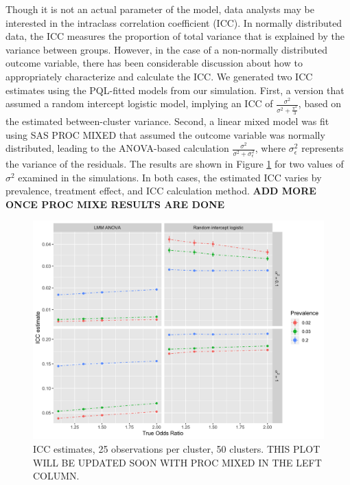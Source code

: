 \documentclass[Afour,times,sagev,doublespace]{sagej}
\begin{document}
Though it is not an actual parameter of the model, data analysts may be interested in the intraclass correlation coefficient (ICC). In normally distributed data, the ICC measures the proportion of total variance that is explained by the variance between groups. However, in the case of a non-normally distributed outcome variable, there has been considerable discussion about how to appropriately characterize and calculate the ICC\cite{wu_comparison_2012}\cite{nakagawa_shinichi_coefficient_2017}. We generated two ICC estimates using the PQL-fitted models from our simulation.  First, a version that assumed a random intercept logistic model, implying an ICC of $\frac{\sigma^2}{\sigma^2+\frac{\pi^2}{3}}$, based on the estimated between-cluster variance\cite{wu_comparison_2012}. Second, a linear mixed model was fit using SAS PROC MIXED that assumed the outcome variable was normally distributed, leading to the ANOVA-based calculation $\frac{\sigma^2}{\sigma^2+\sigma^2_{\epsilon}}$, where $\sigma^2_{\epsilon}$ represents the variance of the residuals\cite{wu_comparison_2012}. The results are shown in Figure \ref{fig:_icc} for two values of $\sigma^2$ examined in the simulations. In both cases, the estimated ICC varies by prevalence, treatment effect, and ICC calculation method. \textbf{ADD MORE ONCE PROC MIXE RESULTS ARE DONE}

\begin{figure}[]
\centering
\includegraphics[width=\linewidth]{_icc_p25_n50v2.png}
  \caption{ICC estimates, 25 observations per cluster, 50 clusters. THIS PLOT WILL BE UPDATED SOON WITH PROC MIXED IN THE LEFT COLUMN.}
    \label{fig:_icc}
\end{figure}
\end{document}
